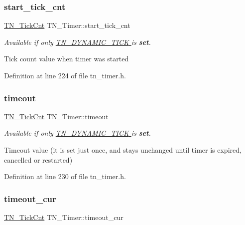 \subsubsection{\texorpdfstring{start\+\_\+tick\+\_\+cnt}{start\_tick\_cnt}}
{\footnotesize\ttfamily \hyperlink{tn__common_8h_ac885b63d00c063de61cdbd80bf26d8aa}{T\+N\+\_\+\+Tick\+Cnt} T\+N\+\_\+\+Timer\+::start\+\_\+tick\+\_\+cnt}



{\itshape Available if only \hyperlink{tn__cfg__default_8h_aaee875834a86f961318c584095c366fe}{{\ttfamily T\+N\+\_\+\+D\+Y\+N\+A\+M\+I\+C\+\_\+\+T\+I\+CK} } is {\bfseries set}.} 

Tick count value when timer was started 

Definition at line 224 of file tn\+\_\+timer.\+h.

\mbox{\label{structTN__Timer_a893c5b01ec38bdcbcf2294cc950ffd09}} 
\subsubsection{\texorpdfstring{timeout}{timeout}}
{\footnotesize\ttfamily \hyperlink{tn__common_8h_ac885b63d00c063de61cdbd80bf26d8aa}{T\+N\+\_\+\+Tick\+Cnt} T\+N\+\_\+\+Timer\+::timeout}



{\itshape Available if only \hyperlink{tn__cfg__default_8h_aaee875834a86f961318c584095c366fe}{{\ttfamily T\+N\+\_\+\+D\+Y\+N\+A\+M\+I\+C\+\_\+\+T\+I\+CK} } is {\bfseries set}.} 

Timeout value (it is set just once, and stays unchanged until timer is expired, cancelled or restarted) 

Definition at line 230 of file tn\+\_\+timer.\+h.

\mbox{\label{structTN__Timer_a6041c660dad74778f668bac9ae844465}} 
\subsubsection{\texorpdfstring{timeout\+\_\+cur}{timeout\_cur}}
{\footnotesize\ttfamily \hyperlink{tn__common_8h_ac885b63d00c063de61cdbd80bf26d8aa}{T\+N\+\_\+\+Tick\+Cnt} T\+N\+\_\+\+Timer\+::timeout\+\_\+cur}



